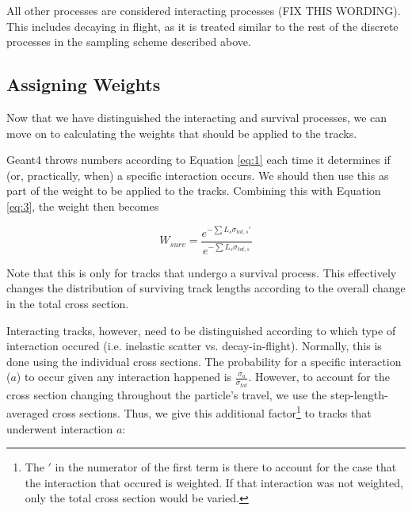 \documentclass[12pt]{article}
\begin{document}
All other processes are considered interacting processes (FIX THIS WORDING). This includes decaying in flight, as it is treated similar to the rest of the discrete processes in the sampling scheme described above. 

\subsection{Assigning Weights}

Now that we have distinguished the interacting and survival processes, we can move on to calculating the weights that should be applied to the tracks. 


Geant4 throws numbers according to Equation \ref{eq:1} each time it determines if (or, practically, when) a specific interaction occurs. We should then use this as part of the weight to be applied to the tracks. Combining this with Equation \ref{eq:3}, the weight then becomes

\begin{equation}\label{eq:surv_weight}
  W_{surv} = \frac{e^{-\sum L_s  \sigma_{tot,s}'}}{e^{-\sum L_s  \sigma_{tot,s}}}
\end{equation}

Note that this is only for tracks that undergo a survival process. This effectively changes the distribution of surviving track lengths according to the overall change in the total cross section. 

Interacting tracks, however, need to be distinguished according to which type of interaction occured (i.e. inelastic scatter vs. decay-in-flight). Normally, this is done using the individual cross sections. The probability for a specific interaction ($a$) to occur given any interaction happened is $\frac{\sigma_a}{\sigma_{tot}}$. However, to account for the cross section changing throughout the particle's travel, we use the step-length-averaged cross sections. Thus, we give this additional factor\footnote{The $'$ in the numerator of the first term is there to account for the case that the interaction that occured is weighted. If that interaction was not weighted, only the total cross section would be varied.} to tracks that underwent interaction $a$:
\end{document}
